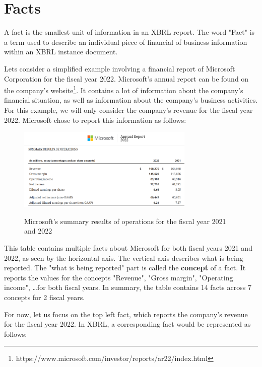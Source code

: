 \section{Facts}
\label{sec:facts}

A fact is the smallest unit of information in an XBRL report. 
The word "Fact" is a term used to describe an individual piece of financial of business information within an XBRL instance document. 

Lets consider a simplified example involving a financial report of Microsoft Corporation for the fiscal year 2022.
Microsoft's annual report can be found on the company's website\footnote[0]{https://www.microsoft.com/investor/reports/ar22/index.html}.
It contains a lot of information about the company's financial situation, as well as information about the company's business activities.
For this example, we will only consider the company's revenue for the fiscal year 2022.
Microsoft chose to report this information as follows:

\begin{figure}[H]
    \centering
    \includegraphics[width=0.75\textwidth]{images/microsoft_annual_report_2022.png}
    \caption{Microsoft's summary results of operations for the fiscal year 2021 and 2022}
    \label{fig:microsoft_annual_report_2022}
    \cite{microsoft2022ar}
\end{figure}

This table contains multiple facts about Microsoft for both fiscal years 2021 and 2022, as seen by the horizontal axis.
The vertical axis describes what is being reported. The "what is being reported" part is called the \textbf{concept} of a fact.
It reports the values for the concepts "Revenue", "Gross margin", "Operating income", \dots for both fiscal years.
In summary, the table contains 14 facts across 7 concepts for 2 fiscal years.

For now, let us focus on the top left fact, which reports the company's revenue for the fiscal year 2022.
In XBRL, a corresponding fact would be represented as follows:

